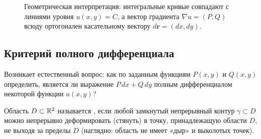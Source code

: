 \begin{figure}[H]
    \centering
    \caption{Геометрическая интерпретация: интегральные кривые совпадают с
    линиями уровня $u(x, y) = C$, а вектор градиента $\nabla u = (P, Q)$ всюду
    ортогонален касательному вектору $d\mathbf{r} = (dx, dy)$.}
\end{figure}

\subsection{Критерий полного дифференциала}

Возникает естественный вопрос: как по заданным функциям $P(x, y)$ и $Q(x, y)$
определить, является ли выражение $P \, dx + Q \, dy$ полным дифференциалом
некоторой функции $u(x, y)$?

\begin{definition}
    Область $D \subset \mathbb{R}^2$ называется , если любой
    замкнутый непрерывный контур $\gamma \subset D$ можно непрерывно
    деформировать (стянуть) в точку, принадлежащую области $D$, не выходя за
    пределы $D$ (наглядно: область не имеет «дыр» и выколотых точек).
\end{definition}

